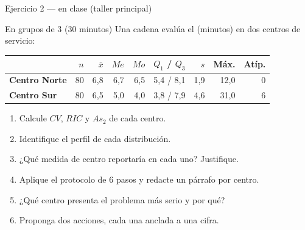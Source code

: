 \documentclass[aspectratio=169,10pt]{beamer}
\begin{document}
\begin{frame}{Ejercicio 2 — en clase (taller principal)}
  \begin{alertblock}{En grupos de 3 (30 minutos)}
    \tiny
    Una cadena evalúa el  (minutos) en dos
    centros de servicio:

    \vspace{0.1cm}
    \centering
    \begin{tabular}{@{}lrrrrrrrr@{}}
      \toprule
      & $n$ & $\bar{x}$ & $Me$ & $Mo$ & $Q_1$ / $Q_3$ & $s$ & Máx. &
      Atíp. \\
      \midrule
      \textbf{Centro Norte} & 80 & 6{,}8 & 6{,}7 & 6{,}5 & 5{,}4 / 8{,}1 &
        1{,}9 & 12{,}0 & 0 \\
      \textbf{Centro Sur}   & 80 & 6{,}5 & 5{,}0 & 4{,}0 & 3{,}8 / 7{,}9 &
        4{,}6 & 31{,}0 & 6 \\
      \bottomrule
    \end{tabular}

    \vspace{0.15cm}
    \raggedright
    \begin{enumerate}\setlength{\itemsep}{-0.07cm}
      \item Calcule $CV$, $RIC$ y $As_2$ de cada centro.
      \item Identifique el perfil de cada distribución.
      \item ¿Qué medida de centro reportaría en cada uno? Justifique.
      \item Aplique el protocolo de 6 pasos y redacte un párrafo por centro.
      \item ¿Qué centro presenta el problema más serio y por qué?
      \item Proponga dos acciones, cada una anclada a una cifra.
    \end{enumerate}
  \end{alertblock}
\end{frame}
\end{document}
